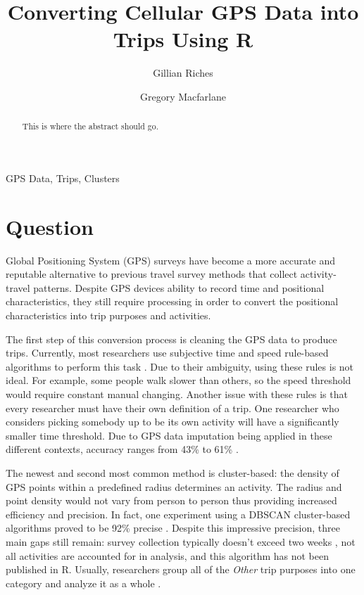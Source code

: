 \documentclass[3p, authoryear]{elsarticle} %
\begin{document}
\begin{frontmatter}

  \title{Converting Cellular GPS Data into Trips Using R}
    \author[Brigham Young University]{Gillian Riches}
    \author[Brigham Young University]{Gregory Macfarlane}
      \address[Brigham Young University]{Civil and Environmental Engineering Department, 232 Engineering Building, Provo, Utah 84602}
  
  \begin{abstract}
  This is where the abstract should go.
  \end{abstract}
   \begin{keyword} GPS Data, Trips, Clusters\end{keyword}
 \end{frontmatter}

\hypertarget{question}{%
\section{Question}\label{question}}

Global Positioning System (GPS) surveys have become a more accurate and reputable alternative to previous travel survey methods that collect activity-travel patterns. Despite GPS devices ability to record time and positional characteristics, they still require processing in order to convert the positional characteristics into trip purposes and activities.

The first step of this conversion process is cleaning the GPS data to produce trips. Currently, most researchers use subjective time and speed rule-based algorithms to perform this task \citep{reviewOfMethods2014}. Due to their ambiguity, using these rules is not ideal. For example, some people walk slower than others, so the speed threshold would require constant manual changing. Another issue with these rules is that every researcher must have their own definition of a trip. One researcher who considers picking somebody up to be its own activity will have a significantly smaller time threshold. Due to GPS data imputation being applied in these different contexts, accuracy ranges from 43\% to 61\% \citep{reviewOfMethods2014}.

The newest and second most common method is cluster-based: the density of GPS points within a predefined radius determines an activity. The radius and point density would not vary from person to person thus providing increased efficiency and precision. In fact, one experiment using a DBSCAN cluster-based algorithms proved to be 92\% precise \citep{DBAlgorithm2017}. Despite this impressive precision, three main gaps still remain: survey collection typically doesn't exceed two weeks \citep{comparisonOfAlgorithms2016}, not all activities are accounted for in analysis, and this algorithm has not been published in R. Usually, researchers group all of the \emph{Other} trip purposes into one category and analyze it as a whole \citep{whereYouAt2019}.
\end{document}
